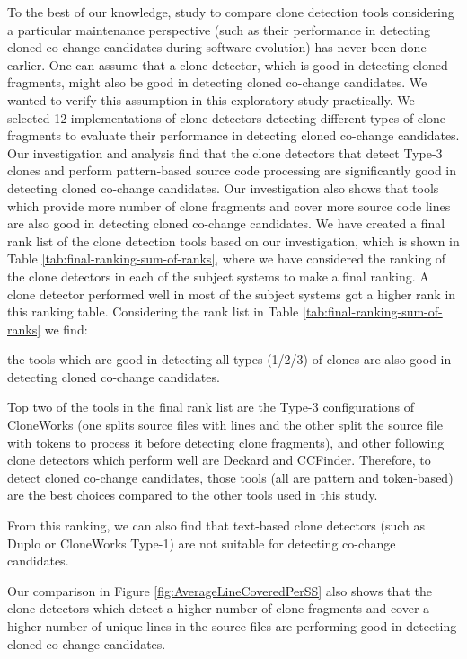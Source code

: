 \documentclass[review]{elsarticle}
\begin{document}
To the best of our knowledge, study to compare clone detection tools considering a particular maintenance perspective (such as their performance in detecting cloned co-change candidates during software evolution) has never been done earlier. One can assume that a clone detector, which is good in detecting cloned fragments, might also be good in detecting cloned co-change candidates. We wanted to verify this assumption in this exploratory study practically. We selected 12 implementations of clone detectors detecting different types of clone fragments to evaluate their performance in detecting cloned co-change candidates. Our investigation and analysis find that the clone detectors that detect Type-3 clones and perform pattern-based source code processing are significantly good in detecting cloned co-change candidates. Our investigation also shows that tools which provide more number of clone fragments and cover more source code lines are also good in detecting cloned co-change candidates. We have created a final rank list of the clone detection tools based on our investigation, which is shown in Table \ref{tab:final-ranking-sum-of-ranks}, where we have considered the ranking of the clone detectors in each of the subject systems to make a final ranking. A clone detector performed well in most of the subject systems got a higher rank in this ranking table. Considering the rank list in Table \ref{tab:final-ranking-sum-of-ranks} we find:
\begin{enumerate*}[label=(\roman*)]
  \item the tools which are good in detecting all types (1/2/3) of clones are also good in detecting cloned co-change candidates. 
  \item Top two of the tools in the final rank list are the Type-3 configurations of CloneWorks (one splits source files with lines and the other split the source file with tokens to process it before detecting clone fragments), and other following clone detectors which perform well are Deckard and CCFinder. Therefore, to detect cloned co-change candidates, those tools (all are pattern and token-based) are the best choices compared to the other tools used in this study.
  \item From this ranking, we can also find that text-based clone detectors (such as Duplo or CloneWorks Type-1) are not suitable for detecting co-change candidates.
  \item Our comparison in Figure \ref{fig:AverageLineCoveredPerSS} also shows that the clone detectors which detect a higher number of clone fragments and cover a higher number of unique lines in the source files are performing good in detecting cloned co-change candidates. 
\end{enumerate*}
\end{document}
